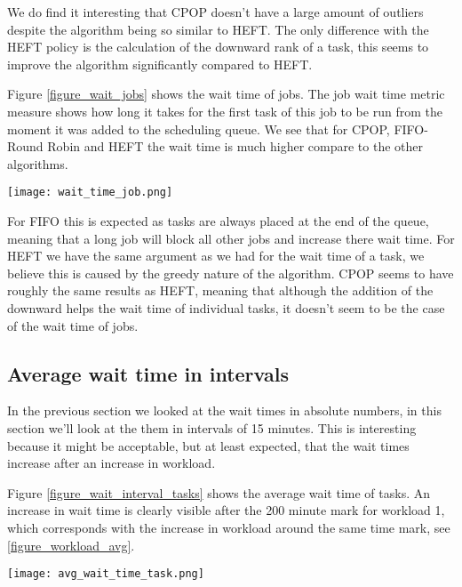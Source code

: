 \documentclass[twocolumn,a4]{scrartcl}
\begin{document}
We do find it interesting that CPOP doesn't have a large amount of outliers despite the algorithm being so similar to HEFT. The only difference with the HEFT policy is the calculation of the downward rank of a task, this seems to improve the algorithm significantly compared to HEFT.

Figure \ref{figure_wait_jobs} shows the wait time of jobs. The job wait time metric measure shows how long it takes for the first task of this job to be run from the moment it was added to the scheduling queue. We see that for CPOP, FIFO-Round Robin and HEFT the wait time is much higher compare to the other algorithms.

\begin{figure*}[p]
  \centering
  \texttt{[image: wait\_time\_job.png]}
  \caption{Wait time for jobs in workload 1 (top) and workload 2 (bottom), using setup 1 (left) and setup 2 (right)}
  \label{figure_wait_jobs}
\end{figure*}

For FIFO this is expected as tasks are always placed at the end of the queue, meaning that a long job will block all other jobs and increase there wait time. For HEFT we have the same argument as we had for the wait time of a task, we believe this is caused by the greedy nature of the algorithm. CPOP seems to have roughly the same results as HEFT, meaning that although the addition of the downward helps the wait time of individual tasks, it doesn't seem to be the case of the wait time of jobs.


\subsection{Average wait time in intervals} \label{sec_results_wait_time_intervals}

In the previous section we looked at the wait times in absolute numbers, in this section we'll look at the them in intervals of 15 minutes. This is interesting because it might be acceptable, but at least expected, that the wait times increase after an increase in workload.

Figure \ref{figure_wait_interval_tasks} shows the average wait time of tasks. An increase in wait time is clearly visible after the 200 minute mark for workload 1, which corresponds with the increase in workload around the same time mark, see \ref{figure_workload_avg}.

\begin{figure*}[p]
    \centering
  \texttt{[image: avg\_wait\_time\_task.png]}
    \caption{Wait time for tasks in intervals of 15 minutes in workload 1 (top) and workload 2 (bottom), using setup 1 (left) and setup 2 (right)}
    \label{figure_wait_interval_tasks}
\end{figure*}
\end{document}
